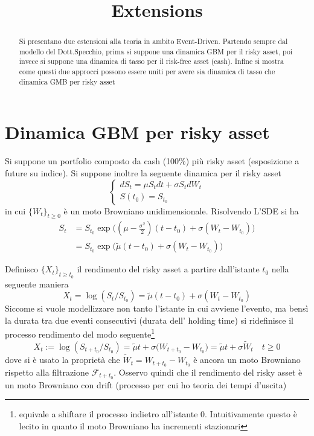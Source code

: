 \documentclass[12pt,a4paper]{article}
\title{Extensions}
\author{}
\theoremstyle{break}
\begin{document}
\maketitle

\begin{abstract}
	Si presentano due estensioni alla teoria in ambito Event-Driven. Partendo sempre dal modello del Dott.Specchio, prima si suppone una dinamica GBM per il risky asset, poi invece si suppone una dinamica di tasso per il risk-free asset (cash). Infine si mostra come questi due approcci possono essere uniti per avere sia dinamica di tasso che dinamica GMB per risky asset
\end{abstract}

\section{Dinamica GBM per risky asset}
Si suppone un portfolio composto da cash (100\%) più risky asset (esposizione a future su indice). Si suppone inoltre la seguente dinamica per il risky asset 
\[
\begin{cases}
dS_t = \mu S_tdt + \sigma S_t dW_t  \\
S(t_0) = S_{t_0}
\end{cases}
\]
in cui $\{W_t\}_{t\geq0}$ è un moto Browniano unidimensionale. Risolvendo L'SDE si ha 
\begin{align}
S_t & = S_{t_0} \exp\big((\mu - \frac{\sigma^2}{2})(t - t_0) + \sigma (W_t - W_{t_0})\big) \\
    & = S_{t_0} \exp\big(\tilde{\mu}(t - t_0) + \sigma (W_t - W_{t_0})\big)
\end{align}

Definisco $\{X_t\}_{t\geq t_0}$ il rendimento del risky asset a partire dall'istante $t_0$ nella seguente maniera \[ X_t = \log(S_t/S_{t_0}) = \tilde{\mu}(t - t_0) + \sigma (W_t - W_{t_0})
\]
Siccome  si vuole modellizzare non tanto l'istante in cui avviene l'evento, ma bensì la durata tra due eventi consecutivi (durata dell' holding time) si ridefinisce il processo rendimento del modo seguente\footnote{equivale a shiftare il processo indietro all'istante 0. Intuitivamente questo è lecito in quanto il moto Browniano ha incrementi stazionari} \[ X_t := \log(S_{t + t_0}/S_{t_0}) = \tilde{\mu}t + \sigma \big(W_{t + t_0} - W_{t_0}\big) = \tilde{\mu}t + \sigma\widetilde{W}_{t} \quad t \geq 0
\]
dove si è usato la proprietà che $\widetilde{W}_t = W_{t + t_0} - W_{t_0}$ è ancora un moto Browniano rispetto alla filtrazione $\mathcal{F}_{t + t_0}$. Osservo quindi che il rendimento del risky asset è un moto Browniano con drift (processo per cui ho teoria dei tempi d'uscita)
\end{document}
